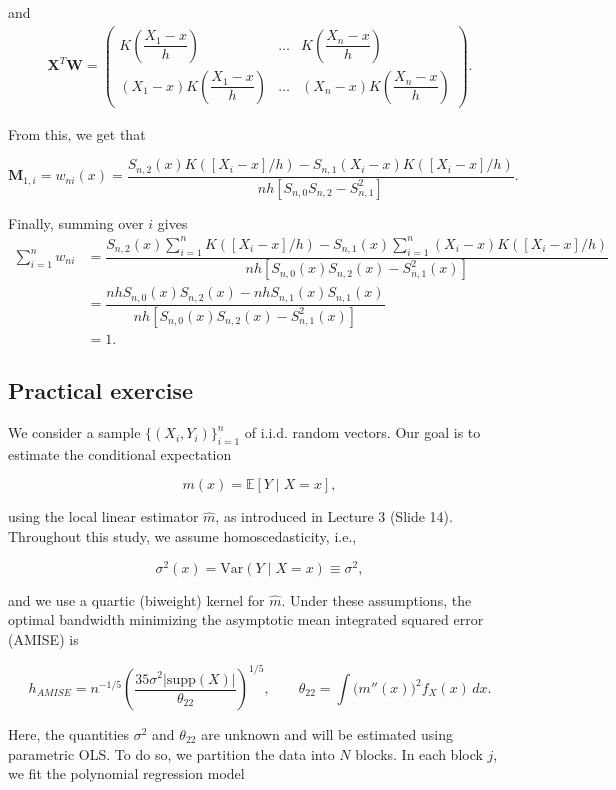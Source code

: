 \documentclass[
  letterpaper,
  DIV=11,
  numbers=noendperiod]{scrartcl}
\begin{document}
and \begin{align*}
\textbf{X}^T \textbf{W} =
\begin{pmatrix}
K\left(\dfrac{X_1-x}{h}\right) & \ldots & K\left(\dfrac{X_n-x}{h}\right) \\
(X_1-x)K\left(\dfrac{X_1-x}{h}\right) & \ldots & (X_n-x) K\left(\dfrac{X_n-x}{h}\right)
\end{pmatrix}.
\end{align*}

From this, we get that

\[
\textbf{M}_{1, i} = w_{ni}(x)= \dfrac{S_{n, 2}(x)K\left([X_i-x]/h\right) - S_{n, 1}(X_i-x)K([X_i-x]/h)}{nh[S_{n, 0}S_{n, 2}-S_{n, 1}^2]}.
\]

Finally, summing over \(i\) gives \begin{align*}
\sum_{i=1}^n w_{ni} &= \dfrac{S_{n, 2}(x) \sum_{i=1}^n K\left([X_i-x]/h\right) - S_{n, 1}(x) \sum_{i=1}^n(X_i-x)K([X_i-x]/h)}{nh[S_{n, 0}(x)S_{n, 2}(x)-S_{n, 1}^2(x)]} \\
&= \dfrac{nh S_{n, 0}(x)S_{n, 2}(x) - nhS_{n, 1}(x)S_{n, 1}(x) }{nh[S_{n, 0}(x)S_{n, 2}(x)-S_{n, 1}^2(x)]}\\
&= 1.
\end{align*}

\subsection{Practical exercise}\label{practical-exercise}

We consider a sample \(\{(X_i, Y_i)\}_{i=1}^n\) of i.i.d. random
vectors. Our goal is to estimate the conditional expectation

\[
m(x) = \mathbb{E}[Y \mid X = x],
\]

using the local linear estimator \(\hat{m}\), as introduced in Lecture 3
(Slide 14). Throughout this study, we assume homoscedasticity, i.e.,

\[
\sigma^2(x) = \mathrm{Var}(Y \mid X = x) \equiv \sigma^2,
\]

and we use a quartic (biweight) kernel for \(\hat{m}\). Under these
assumptions, the optimal bandwidth minimizing the asymptotic mean
integrated squared error (AMISE) is

\[
h_{AMISE} = n^{-1/5} \left( \frac{35 \sigma^2 | \text{supp}(X) |}{\theta_{22}} \right)^{1/5}, 
\qquad 
\theta_{22} = \int \big( m''(x) \big)^2 f_X(x)\, dx.
\]

Here, the quantities \(\sigma^2\) and \(\theta_{22}\) are unknown and
will be estimated using parametric OLS. To do so, we partition the data
into \(N\) blocks. In each block \(j\), we fit the polynomial regression
model
\end{document}
